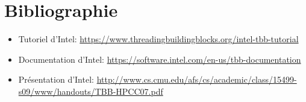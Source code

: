 \documentclass[10pt,a4paper]{article}
\begin{document}
\section{Bibliographie}
\begin{itemize}
	\item Tutoriel d'Intel: \url{https://www.threadingbuildingblocks.org/intel-tbb-tutorial}
	\item Documentation d'Intel: \url{https://software.intel.com/en-us/tbb-documentation}
	\item Présentation d'Intel: \url{http://www.cs.cmu.edu/afs/cs/academic/class/15499-s09/www/handouts/TBB-HPCC07.pdf}
\end{itemize}
\end{document}
